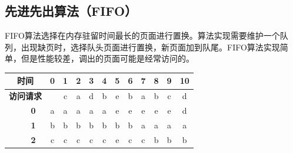 \vspace{0.5cm}

\subsection{先进先出算法（FIFO）}

FIFO算法选择在内存驻留时间最长的页面进行置换。算法实现需要维护一个队列，出现缺页时，选择队头页面进行置换，新页面加到队尾。FIFO算法实现简单，但是性能较差，调出的页面可能是经常访问的。

\begin{table}[H]
    \centering
    \begin{tabular}{|clc|c|c|c|c|c|c|c|c|c|c|c|}
        \hline
        \multicolumn{3}{|c|}{\textbf{时间}}                       & \textbf{0} & \textbf{1} & \textbf{2}               & \textbf{3}               & \textbf{4}               & \textbf{5}               & \textbf{6}               & \textbf{7}               & \textbf{8}               & \textbf{9}               & \textbf{10}                                         \\ \hline
        \multicolumn{3}{|c|}{\textbf{访问请求}}                   &            & c          & a                        & d                        & b                        & e                        & b                        & a                        & b                        & c                        & d                                                   \\ \hline
        \multicolumn{2}{|c|}{}                                    & \textbf{0} & a          & {\color[HTML]{333333} a} & {\color[HTML]{FE0000} a} & {\color[HTML]{333333} a} & {\color[HTML]{333333} a} & {\color[HTML]{333333} e} & {\color[HTML]{333333} e} & {\color[HTML]{FE0000} e} & {\color[HTML]{333333} e} & {\color[HTML]{333333} e} & {\color[HTML]{FE0000} d} \\ \cline{3-14}
        \multicolumn{2}{|c|}{}                                    & \textbf{1} & b          & {\color[HTML]{333333} b} & {\color[HTML]{333333} b} & {\color[HTML]{333333} b} & {\color[HTML]{FE0000} b} & {\color[HTML]{333333} b} & {\color[HTML]{FE0000} b} & {\color[HTML]{333333} a} & {\color[HTML]{333333} a} & {\color[HTML]{333333} a} & a                        \\ \cline{3-14}
        \multicolumn{2}{|c|}{}                                    & \textbf{2} & c          & {\color[HTML]{FE0000} c} & {\color[HTML]{333333} c} & {\color[HTML]{333333} c} & {\color[HTML]{333333} c} & {\color[HTML]{FE0000} e} & {\color[HTML]{333333} c} & {\color[HTML]{333333} c} & {\color[HTML]{FE0000} b} & {\color[HTML]{333333} b} & b                        \\ \cline{3-14}

\end{tabular}
\end{table}
